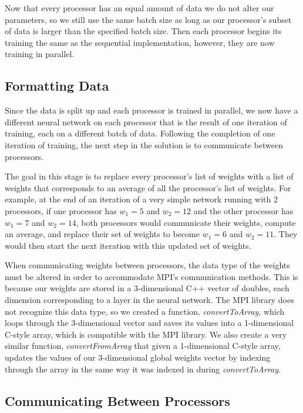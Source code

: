 \documentclass[11pt,twocolumn]{article}
\begin{document}
Now that every processor has an equal amount of data we do not alter our parameters, so we still use the same batch size as long as our processor's subset of data is larger than the specified batch size. Then each processor begins its training the same as the sequential implementation, however, they are now training in parallel.

\subsection{Formatting Data}

Since the data is split up and each processor is trained in parallel, we now have a different neural network on each processor that is the result of one iteration of training, each on a different batch of data. Following the completion of one iteration of training, the next step in the solution is to communicate between processors. 

The goal in this stage is to replace every processor's list of weights with a list of weights that corresponds to an average of all the processor's list of weights. For example, at the end of an iteration of a very simple network running with 2 processors, if one processor has $w_1 = 5$ and $w_2 = 12$ and the other processor has $w_1 = 7$ and $w_2 = 14$, both processors would communicate their weights, compute an average, and replace their set of weights to become $w_1 = 6$ and $w_2 = 11$. They would then start the next iteration with this updated set of weights. 

When communicating weights between processors, the data type of the weights must be altered in order to accommodate MPI's communication methods. This is because our weights are stored in a 3-dimensional C++ vector of doubles, each dimension corresponding to a layer in the neural network. The MPI library does not recognize this data type, so we created a function, \emph{convertToArray}, which loops through the 3-dimensional vector and saves its values into a 1-dimensional C-style array, which is compatible with the MPI library. We also create a very similar function, \emph{convertFromArray} that given a 1-dimensional C-style array, updates the values of our 3-dimensional global weights vector by indexing through the array in the same way it was indexed in during \emph{convertToArray}.

\subsection{Communicating Between Processors}
\end{document}
